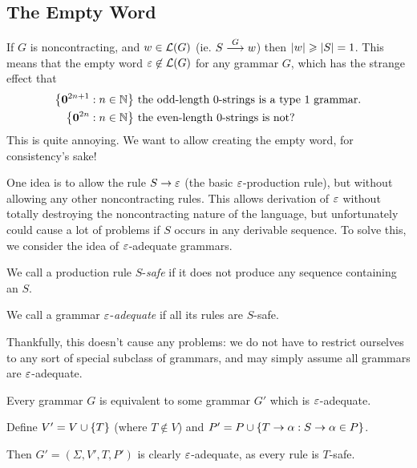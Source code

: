 \documentclass{article}
\begin{document}
\subsection{The Empty Word}

If $G$ is noncontracting, and $w \in \mathcal{L}(G)$ (ie. $S \stackrel{G}{\longrightarrow} w$) then $\left\lvert w \right\rvert \geqslant \left\lvert S \right\rvert = 1$. This means that the empty word $\varepsilon \not\in \mathcal{L}(G)$ for any grammar $G$, which has the strange effect that
\begin{align*}
	\left\lbrace \mathbf{0}^{2n+1}: n \in \mathbb{N} \right\rbrace & \text{ the odd-length 0-strings is a type 1 grammar.} \\
	\left\lbrace \mathbf{0}^{2n}: n \in \mathbb{N} \right\rbrace   & \text{ the even-length 0-strings is not?}             
\end{align*}
This is quite annoying. We want to allow creating the empty word, for consistency's sake!

One idea is to allow the rule $S \to \varepsilon$ (the basic $\varepsilon$-production rule), but without allowing any other noncontracting rules. This allows derivation of $\varepsilon$ without totally destroying the noncontracting nature of the language, but unfortunately could cause a lot of problems if $S$ occurs in any derivable sequence. To solve this, we consider the idea of $\varepsilon$-adequate grammars.

\begin{definition}
	We call a production rule $S$-\textit{safe} if it does not produce any sequence containing an $S$.
	    
	We call a grammar $\varepsilon$-\textit{adequate} if all its rules are $S$-safe.
\end{definition}

Thankfully, this doesn't cause any problems: we do not have to restrict ourselves to any sort of special subclass of grammars, and may simply assume all grammars are $\varepsilon$-adequate.

\begin{proposition}
	\label{epsilon-adequate-weak}
	Every grammar $G$ is equivalent to some grammar $G'$ which is $\varepsilon$-adequate.
\end{proposition}

\begin{prf}
	Define $V' = V \cup \left\lbrace T \right\rbrace$ (where $T \not\in V$) and $P' = P \cup \left\lbrace T \to \alpha : S \to \alpha \in P \right\rbrace$.
	    
	Then $G' = (\Sigma, V', T, P')$ is clearly $\varepsilon$-adequate, as every rule is $T$-safe.
\end{prf}
\end{document}
